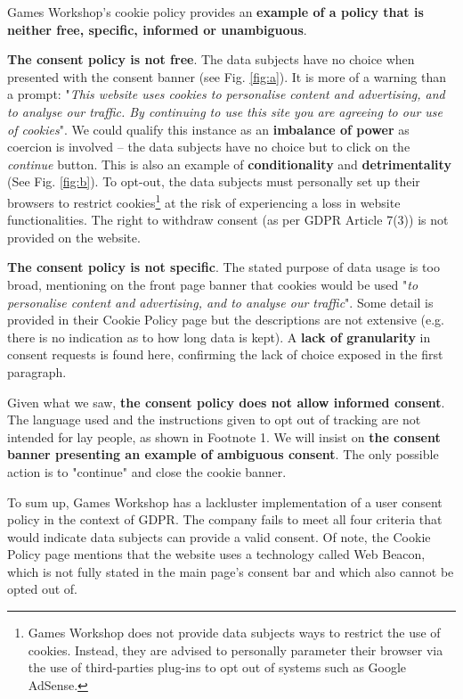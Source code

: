 \documentclass[twocolumn, letterpaper]{scrartcl}
\begin{document}
	    Games Workshop's cookie policy provides an \textbf{example of a policy that is neither free, specific, informed or unambiguous}.
	
    	\textbf{The consent policy is not free}. The data subjects have no choice when presented with the consent banner (see Fig. \ref{fig:a}). It is more of a warning than a prompt: "\textit{This website uses cookies to personalise content and advertising, and to analyse our traffic. By continuing to use this site you are agreeing to our use of cookies}". We could qualify this instance as an \textbf{imbalance of power} as coercion is involved -- the data subjects have no choice but to click on the \textit{continue} button. This is also an example of \textbf{conditionality} and \textbf{detrimentality} (See Fig. \ref{fig:b}). To opt-out, the data subjects must personally set up their browsers to restrict cookies\footnote{Games Workshop does not provide data subjects ways to restrict the use of cookies. Instead, they are advised to personally parameter their browser via the use of third-parties plug-ins to opt out of systems such as Google AdSense.} at the risk of experiencing a loss in website functionalities. The right to withdraw consent (as per GDPR Article 7(3)) is not provided on the website.
    	
    	\textbf{The consent policy is not specific}. The stated purpose of data usage is too broad, mentioning on the front page banner that cookies would be used "\textit{to personalise content and advertising, and to analyse our traffic}". Some detail is provided in their Cookie Policy page\cite{GW_CN} but the descriptions are not extensive (e.g. there is no indication as to how long data is kept). A \textbf{lack of granularity} in consent requests is found here, confirming the lack of choice exposed in the first paragraph.
    	
    	Given what we saw, \textbf{the consent policy does not allow informed consent}. The language used and the instructions given to opt out of tracking are not intended for lay people, as shown in Footnote 1. We will insist on \textbf{the consent banner presenting an example of ambiguous consent}. The only possible action is to "continue" and close the cookie banner.
    	
    	To sum up, Games Workshop has a lackluster implementation of a user consent policy in the context of GDPR. The company fails to meet all four criteria that would indicate data subjects can provide a valid consent. Of note, the Cookie Policy page mentions that the website uses a technology called Web Beacon, which is not fully stated in the main page's consent bar and which also cannot be opted out of.
 	
\end{document}

